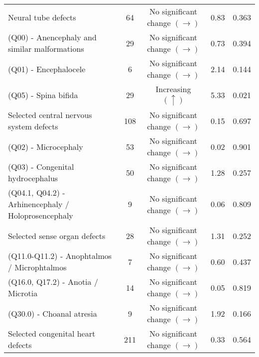 \documentclass[
]{krantz}
\begin{document}
\begin{longtable}[t]{>{\raggedright\arraybackslash}p{4cm}cccc}
\endfoot
\bottomrule
\endlastfoot
Neural tube defects & 64 & \makecell[c]{No significant \\ change $\left(\rightarrow \right)$} & 0.83 & 0.363\\
(Q00) - Anencephaly and similar malformations & 29 & \makecell[c]{No significant \\ change $\left(\rightarrow \right)$} & 0.73 & 0.394\\
(Q01) - Encephalocele & 6 & \makecell[c]{No significant \\ change $\left(\rightarrow \right)$} & 2.14 & 0.144\\
(Q05) - Spina bifida & 29 & Increasing $\left(\uparrow \right)$ & 5.33 & 0.021\\
Selected central nervous system defects & 108 & \makecell[c]{No significant \\ change $\left(\rightarrow \right)$} & 0.15 & 0.697\\
\addlinespace
(Q02) - Microcephaly & 53 & \makecell[c]{No significant \\ change $\left(\rightarrow \right)$} & 0.02 & 0.901\\
(Q03) - Congenital hydrocephalus & 50 & \makecell[c]{No significant \\ change $\left(\rightarrow \right)$} & 1.28 & 0.257\\
(Q04.1, Q04.2) - Arhinencephaly / Holoprosencephaly & 9 & \makecell[c]{No significant \\ change $\left(\rightarrow \right)$} & 0.06 & 0.809\\
Selected sense organ defects & 28 & \makecell[c]{No significant \\ change $\left(\rightarrow \right)$} & 1.31 & 0.252\\
(Q11.0-Q11.2) - Anophtalmos / Microphtalmos & 7 & \makecell[c]{No significant \\ change $\left(\rightarrow \right)$} & 0.60 & 0.437\\
\addlinespace
(Q16.0, Q17.2) - Anotia / Microtia & 14 & \makecell[c]{No significant \\ change $\left(\rightarrow \right)$} & 0.05 & 0.819\\
(Q30.0) - Choanal atresia & 9 & \makecell[c]{No significant \\ change $\left(\rightarrow \right)$} & 1.92 & 0.166\\
Selected congenital heart defects & 211 & \makecell[c]{No significant \\ change $\left(\rightarrow \right)$} & 0.33 & 0.564\\

\end{longtable}
\end{document}
